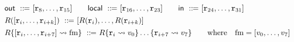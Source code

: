 \begin{figure}[!t]
    \[
     \begin{array}{l}
     \outRN \ \define \  [\reg{8}, \dots, \reg{15}]
     \qquad
     \localRN \ \define \  [\reg{16}, \dots, \reg{23}] %
      \qquad
     \inRN \ \define \  [\reg{24}, \dots, \reg{31}]
     \\
     \\[-8pt]
     \RFile([\reg{i}, \dots, \reg{i+k}]) \ \define\
     [\RFile(\reg{i}), \dots, \RFile(\reg{i+k})]
     \\
     \\[-8pt]
     \Rupd{\reg{i}, \dots, \reg{i+7}}{\fm} \ \define \
			R\{ \reg{i} \rightsquigarrow \val_0 \}
				\dots \{ \reg{i+7} \rightsquigarrow \val_7 \}
			\qquad
			\text{where }\ \ \fm = [\val_0, \dots, \val_7]
     \\
     \\ %


\end{array}\]
\end{figure}
